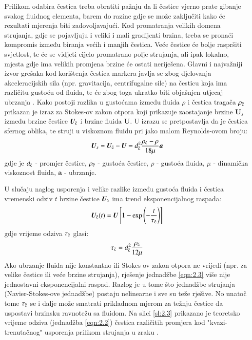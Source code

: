 \begin{description}[style=unboxed,leftmargin=0cm]
	\item[Zaostajanje brzine (\textit{eng. velocity lag}).] Prilikom odabira čestica treba obratiti pažnju da li čestice vjerno prate gibanje svakog fluidnog elementa, barem do razine gdje se može zaključiti kako će rezultati mjerenja biti zadovoljavajući. Kod promatranja velikih domena strujanja, gdje se pojavljuju i veliki i mali gradijenti brzina, treba se pronaći kompromis između biranja većih i manjih čestica. Veće čestice će bolje raspršiti svjetlost, te će se vidjeti cijelo promatrano polje strujanja, ali ipak lokalno, mjesta gdje ima velikih promjena brzine će ostati neriješena. Glavni i najvažniji izvor grešaka kod korištenja čestica markera javlja se zbog djelovanja akceleracijskih sila (npr. gravitacija, centrifugalne sile) na česticu koja ima različitu gustoću od fluida, te će zbog toga ukratko biti objašnjen utjecaj ubrzanja \cite{raffel2018_book}. Kako postoji razlika u gustoćama između fluida $\rho$ i čestica tragača $\rho_\textup{č}$ prikazan je izraz za Stokes-ov zakon otpora \cite{Pehnec2020Predavanja} koji prikazuje zaostajanje brzine $\boldsymbol{U}_s$ između brzine čestice $\boldsymbol{U}_\textup{č}$ i brzine fluida $\boldsymbol{U}$. U izrazu se pretpostavlja da je čestica sfernog oblika, te struji u viskoznom fluidu pri jako malom Reynolds-ovom broju:
	\begin{equation}
		\boldsymbol{U}_{s}=\boldsymbol{U}_\textup{č}-\boldsymbol{U}=d_\textup{č}^2\dfrac{\rho_\textup{č}-\rho}{18\mu}\boldsymbol{a}
		\label{eqn:2.1}	
	\end{equation}
	gdje je $d_\textup{č}$ - promjer čestice, $\rho_\textup{č}$ - gustoća čestice, $\rho$ - gustoća fluida, $\mu$ - dinamička viskoznost fluida, $\boldsymbol{a}$ - ubrzanje.
	\par
	U slučaju naglog usporenja i velike razlike između gustoća fluida i čestica vremenski odziv $t$ brzine čestice $\boldsymbol{U}_\textup{č}$ ima trend eksponencijalnog raspada:
	\begin{equation}
		\boldsymbol{U}_\textup{č}(t)=\boldsymbol{U}\left[1-\exp\left(-\dfrac{t}{\tau_\textup{č}}\right)\right]
		\label{eqn:2.2}	
	\end{equation}
	gdje vrijeme odziva $\tau_\textup{č}$ glasi:
	\begin{equation}
		\tau_\textup{č}=d_\textup{č}^2\dfrac{\rho_\textup{č}}{12\mu}
		\label{eqn:2.3}
	\end{equation}
	Ako ubrzanje fluida nije konstantno ili Stokes-ov zakon otpora ne vrijedi (npr. za velike čestice ili veće brzine strujanja), rješenje jednadžbe \ref{eqn:2.3} više nije jednostavni eksponencijalni raspad. Razlog je u tome što jednadžbe strujanja (Navier-Stokes-ove jednadžbe) postaju nelinearne i sve su teže rješive. No unatoč tome $\tau_\textup{č}$ se i dalje može smatrati prikladnom mjerom za težnju čestice da uspostavi brzinsku ravnotežu sa fluidom. Na slici \ref{sl:2.3} prikazano je teoretsko vrijeme odziva (jednadžba \ref{eqn:2.2}) čestica različitih promjera kod "kvazi-trenutačnog" usporenja prilikom strujanja u zraku \cite{raffel2018_book}.

\end{description}
